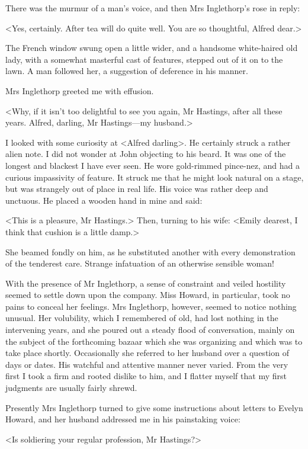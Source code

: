  There was the murmur of a man's voice, and then Mrs Inglethorp's rose in reply: 

 <Yes, certainly. After tea will do quite well. You are so thoughtful, Alfred dear.> 

 The French window swung open a little wider, and a handsome white-haired old lady, with a somewhat masterful cast of features, stepped out of it on to the lawn. A man followed her, a suggestion of deference in his manner. 

 Mrs Inglethorp greeted me with effusion. 

 <Why, if it isn't too delightful to see you again, Mr Hastings, after all these years. Alfred, darling, Mr Hastings—my husband.> 

 I looked with some curiosity at <Alfred darling>. He certainly struck a rather alien note. I did not wonder at John objecting to his beard. It was one of the longest and blackest I have ever seen. He wore gold-rimmed pince-nez, and had a curious impassivity of feature. It struck me that he might look natural on a stage, but was strangely out of place in real life. His voice was rather deep and unctuous. He placed a wooden hand in mine and said: 

 <This is a pleasure, Mr Hastings.> Then, turning to his wife: <Emily dearest, I think that cushion is a little damp.> 

 She beamed fondly on him, as he substituted another with every demonstration of the tenderest care. Strange infatuation of an otherwise sensible woman! 

 With the presence of Mr Inglethorp, a sense of constraint and veiled hostility seemed to settle down upon the company. Miss Howard, in particular, took no pains to conceal her feelings. Mrs Inglethorp, however, seemed to notice nothing unusual. Her volubility, which I remembered of old, had lost nothing in the intervening years, and she poured out a steady flood of conversation, mainly on the subject of the forthcoming bazaar which she was organizing and which was to take place shortly. Occasionally she referred to her husband over a question of days or dates. His watchful and attentive manner never varied. From the very first I took a firm and rooted dislike to him, and I flatter myself that my first judgments are usually fairly shrewd. 

 Presently Mrs Inglethorp turned to give some instructions about letters to Evelyn Howard, and her husband addressed me in his painstaking voice: 

 <Is soldiering your regular profession, Mr Hastings?> 

